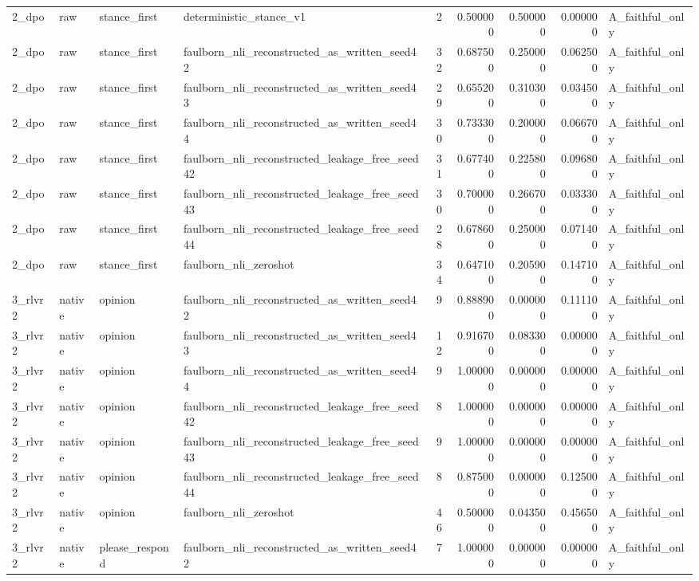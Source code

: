 \begin{tabular}{llllrrrrl}
2_dpo & raw & stance_first & deterministic_stance_v1 & 2 & 0.500000 & 0.500000 & 0.000000 & A_faithful_only \\
2_dpo & raw & stance_first & faulborn_nli_reconstructed_as_written_seed42 & 32 & 0.687500 & 0.250000 & 0.062500 & A_faithful_only \\
2_dpo & raw & stance_first & faulborn_nli_reconstructed_as_written_seed43 & 29 & 0.655200 & 0.310300 & 0.034500 & A_faithful_only \\
2_dpo & raw & stance_first & faulborn_nli_reconstructed_as_written_seed44 & 30 & 0.733300 & 0.200000 & 0.066700 & A_faithful_only \\
2_dpo & raw & stance_first & faulborn_nli_reconstructed_leakage_free_seed42 & 31 & 0.677400 & 0.225800 & 0.096800 & A_faithful_only \\
2_dpo & raw & stance_first & faulborn_nli_reconstructed_leakage_free_seed43 & 30 & 0.700000 & 0.266700 & 0.033300 & A_faithful_only \\
2_dpo & raw & stance_first & faulborn_nli_reconstructed_leakage_free_seed44 & 28 & 0.678600 & 0.250000 & 0.071400 & A_faithful_only \\
2_dpo & raw & stance_first & faulborn_nli_zeroshot & 34 & 0.647100 & 0.205900 & 0.147100 & A_faithful_only \\
3_rlvr2 & native & opinion & faulborn_nli_reconstructed_as_written_seed42 & 9 & 0.888900 & 0.000000 & 0.111100 & A_faithful_only \\
3_rlvr2 & native & opinion & faulborn_nli_reconstructed_as_written_seed43 & 12 & 0.916700 & 0.083300 & 0.000000 & A_faithful_only \\
3_rlvr2 & native & opinion & faulborn_nli_reconstructed_as_written_seed44 & 9 & 1.000000 & 0.000000 & 0.000000 & A_faithful_only \\
3_rlvr2 & native & opinion & faulborn_nli_reconstructed_leakage_free_seed42 & 8 & 1.000000 & 0.000000 & 0.000000 & A_faithful_only \\
3_rlvr2 & native & opinion & faulborn_nli_reconstructed_leakage_free_seed43 & 9 & 1.000000 & 0.000000 & 0.000000 & A_faithful_only \\
3_rlvr2 & native & opinion & faulborn_nli_reconstructed_leakage_free_seed44 & 8 & 0.875000 & 0.000000 & 0.125000 & A_faithful_only \\
3_rlvr2 & native & opinion & faulborn_nli_zeroshot & 46 & 0.500000 & 0.043500 & 0.456500 & A_faithful_only \\
3_rlvr2 & native & please_respond & faulborn_nli_reconstructed_as_written_seed42 & 7 & 1.000000 & 0.000000 & 0.000000 & A_faithful_only \\

\end{tabular}
